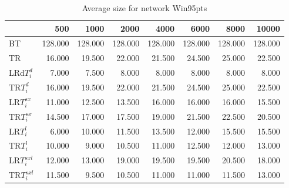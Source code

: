 \begin{table}
\begin{center}
\begin{tabular}{lrrrrrrr}
 & 500 &  1000 & 2000 & 4000 & 6000& 8000&  10000\\\hline
BT & 128.000 & 128.000 & 128.000 & 128.000 & 128.000 & 128.000 & 128.000\\\hline
TR & 16.000 & 19.500 & 22.000 & 21.500 & 24.500 & 25.000 & 22.500\\\hline
LRd$T_i^d$ & 7.000 & 7.500 & 8.000 & 8.000 & 8.000 & 8.000 & 8.000\\\hline
TR$T_i^d$ & 16.000 & 19.500 & 22.000 & 21.500 & 24.500 & 25.000 & 22.500\\\hline
LR$T_i^{sx}$ & 11.000 & 12.500 & 13.500 & 16.000 & 16.000 & 16.000 & 15.500\\\hline
TR$T_i^{sx}$ & 14.500 & 17.000 & 17.500 & 19.000 & 21.500 & 22.500 & 20.500\\\hline
LR$T_i^l$ & 6.000 & 10.000 & 11.500 & 13.500 & 12.000 & 15.500 & 15.500\\\hline
TR$T_i^l$ & 10.000 & 9.000 & 10.500 & 11.000 & 12.500 & 12.000 & 13.000\\\hline
LR$T_i^{sxl}$ & 12.000 & 13.000 & 19.000 & 19.500 & 19.500 & 20.500 & 18.000\\\hline
TR$T_i^{sxl}$ & 11.500 & 9.500 & 10.500 & 11.000 & 11.000 & 11.500 & 13.000\\\hline
\end{tabular}
\end{center}
\caption{Average size for network Win95pts }
\label{Win95ptssi}
\end{table}

